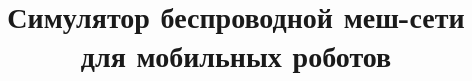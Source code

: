 \documentclass[%
]{report}
\begin{document}



\title{Симулятор беспроводной меш-сети для мобильных роботов}



\end{document}
